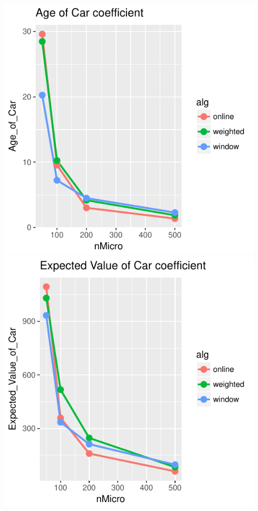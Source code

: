 \includegraphics{offline_regression_files/figure-latex/unnamed-chunk-7-3.pdf}
\includegraphics{offline_regression_files/figure-latex/unnamed-chunk-7-4.pdf}
